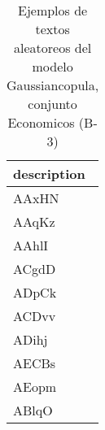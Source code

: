 \begin{table}[H]
\centering
\fontsize{8}{14}\selectfont
\caption{Ejemplos de textos aleatoreos del modelo Gaussiancopula, conjunto Economicos (B-3)}
\label{table-sample10-economicos-b-3-gaussiancopula-text}
\begin{tabular}{|m{50em}|}
\hline
\rowcolor[gray]{0.8}
description \\
\hline AAxHN \\
\hline AAqKz \\
\hline AAhlI \\
\hline ACgdD \\
\hline ADpCk \\
\hline ACDvv \\
\hline ADihj \\
\hline AECBs \\
\hline AEopm \\
\hline ABlqO \\
\hline
\end{tabular}
\end{table}
